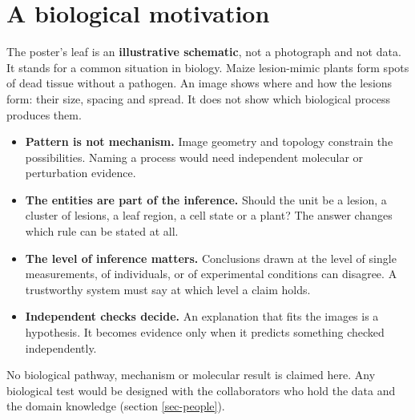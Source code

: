 \documentclass[11pt, a4paper]{article}
\begin{document}
\section{A biological motivation}
\label{sec-biology}
The poster's leaf is an \textbf{illustrative schematic}, not a photograph and not data. It stands for a common situation in
biology. Maize lesion-mimic plants form spots of dead tissue without a pathogen. An image shows where and how the lesions
form: their size, spacing and spread. It does not show which biological process produces them.

\begin{itemize}
\item \textbf{Pattern is not mechanism.} Image geometry and topology constrain the possibilities. Naming a process would need
independent molecular or perturbation evidence.
\item \textbf{The entities are part of the inference.} Should the unit be a lesion, a cluster of lesions, a leaf region, a cell
state or a plant? The answer changes which rule can be stated at all.
\item \textbf{The level of inference matters.} Conclusions drawn at the level of single measurements, of individuals, or of
experimental conditions can disagree. A trustworthy system must say at which level a claim holds.
\item \textbf{Independent checks decide.} An explanation that fits the images is a hypothesis. It becomes evidence only when it
predicts something checked independently.
\end{itemize}

No biological pathway, mechanism or molecular result is claimed here. Any biological test would be designed with the
collaborators who hold the data and the domain knowledge (section \ref{sec-people}).
\end{document}
